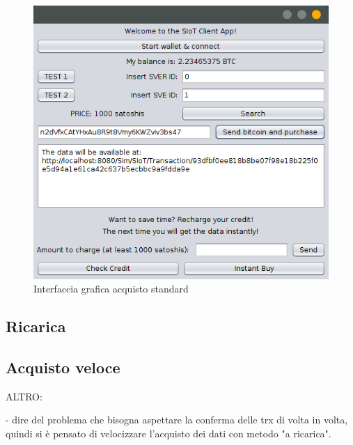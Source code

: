 \begin{figure}[h!t]
\centerline{\includegraphics[width=\textwidth]{img/gui-final-client}}
\caption{Interfaccia grafica acquisto standard}
\label{f:integr:gui-final-client}
\end{figure}

\subsection{Ricarica}

\subsection{Acquisto veloce}


ALTRO:

- dire del problema che bisogna aspettare la conferma delle trx di volta in volta, quindi si è pensato di velocizzare l'acquisto dei dati con metodo "a ricarica".

